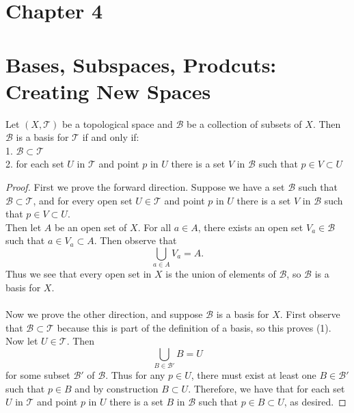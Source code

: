 \documentclass[a4paper,12pt,twoside]{hmcpset}
\begin{document}
\section*{Chapter 4\\\\
                    Bases, Subspaces, Prodcuts: Creating New Spaces} 
\begin{problem}[Theorem 4.1] Let $(X, \mathscr{T})$ be a topological
    space and $\mathscr{B}$ be a collection of subsets of $X$. Then
    $\mathscr{B}$ is a basis for $\mathscr{T}$ if and only if:\\
    1. $\mathscr{B} \subset \mathscr{T}$\\
    2. for each set $U$ in $\mathscr{T}$ and point $p$ in $U$ there is
    a set $V$ in $\mathscr{B}$ such that $p \in V \subset U$
\end{problem}

\begin{proof}
    First we prove the forward direction. Suppose we have a set
    $\mathscr{B}$ such that $\mathscr{B} \subset \mathscr{T}$,
    and for every open set $U \in \mathscr{T}$ and point $p$ in $U$
    there is a set $V$ in $\mathscr{B}$ such that $p \in V \subset U.$
    \\
    Then let $A$ be an open set of $X$. For all $a \in A$, there exists an
    open set $V_a \in \mathscr{B}$ such that $a \in V_a \subset A$.
    Then observe that 
    \[
      \bigcup\limits_{a \in A} V_a = A.
    \]
    Thus we see that every open set in $X$ is the union of elements of
    $\mathscr{B}$, so $\mathscr{B}$ is a basis for $X$.
    \\
    \\
    Now we prove the other direction, and suppose $\mathscr{B}$ is a
    basis for $X$. First observe that $\mathscr{B}
    \subset \mathscr{T}$ because this is part of the definition of a
    basis, so this proves (1). Now let $U \in \mathscr{T}$. Then 
    \[
      \bigcup_{B \in \mathscr{B}'} B = U
    \]
    for some subset $\mathscr{B}'$ of $\mathscr{B}$.
    Thus for any $p \in U$, there must exist at least one
    $B\in \mathscr{B}'$ such that $p \in
    B$ and by construction $B \subset U$. Therefore, we have that for 
    each set $U$ in $\mathscr{T}$ and point $p$ in $U$ there is
    a set $B$ in $\mathscr{B}$ such that $p \in B \subset U$, as desired.
\end{proof}
\end{document}
